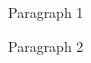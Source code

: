 \documentclass[12pt, a4paper]{article}
\begin{document}
  \par Paragraph 1 \cite{HomeAdvisor}
  \par Paragraph 2 \cite{UN_Ageing}

\printbibliography
\end{document}
